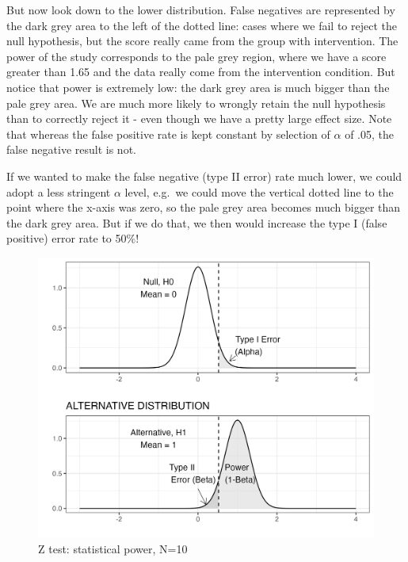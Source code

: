 \documentclass{krantz}
\begin{document}
But now look down to the lower distribution. False negatives are represented by the dark grey area to the left of the dotted line: cases where we fail to reject the null hypothesis, but the score really came from the group with intervention. The power of the study corresponds to the pale grey region, where we have a score greater than 1.65 and the data really come from the intervention condition. But notice that power is extremely low: the dark grey area is much bigger than the pale grey area. We are much more likely to wrongly retain the null hypothesis than to correctly reject it - even though we have a pretty large effect size. Note that whereas the false positive rate is kept constant by selection of \(\alpha\) of .05, the false negative result is not.

If we wanted to make the false negative (type II error) rate much lower, we could adopt a less stringent \(\alpha\) level, e.g.~we could move the vertical dotted line to the point where the x-axis was zero, so the pale grey area becomes much bigger than the dark grey area. But if we do that, we then would increase the type I (false positive) error rate to 50\%!

\begin{figure}
\includegraphics[width=0.6\linewidth]{images_bw/densplot2} \caption{Z test: statistical power, N=10}\label{fig:densplot2}
\end{figure}
\end{document}
